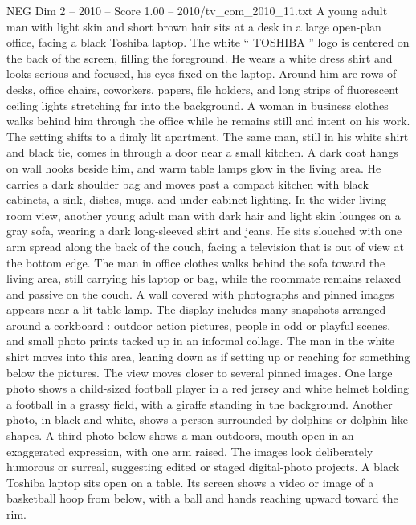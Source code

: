 \begin{textsample}{NEG Dim 2 – 2010 – Score 1.00 – 2010/tv\_com\_2010\_11.txt}  \label{ex:f2_neg_047}
A young adult man with light skin and short brown hair sits at a desk in a large open-plan office, facing a black Toshiba laptop.
The white “ TOSHIBA ” logo is centered on the back of the screen, filling the foreground.
He wears a white dress shirt and looks serious and focused, his eyes fixed on the laptop.
Around him are rows of desks, office chairs, coworkers, papers, file holders, and long strips of fluorescent ceiling lights stretching far into the background.
A woman in business clothes walks behind him through the office while he remains still and intent on his work.
The setting shifts to a dimly lit apartment.
The same man, still in his white shirt and black tie, comes in through a door near a small kitchen.
A dark coat hangs on wall hooks beside him, and warm table lamps glow in the living area.
He carries a dark shoulder bag and moves past a compact kitchen with black cabinets, a sink, dishes, mugs, and under-cabinet lighting.
In the wider living room view, another young adult man with dark hair and light skin lounges on a gray sofa, wearing a dark long-sleeved shirt and jeans.
He sits slouched with one arm spread along the back of the couch, facing a television that is out of view at the bottom edge.
The man in office clothes walks behind the sofa toward the living area, still carrying his laptop or bag, while the roommate remains relaxed and passive on the couch.
A wall covered with photographs and pinned images appears near a lit table lamp.
The display includes many snapshots arranged around a corkboard : outdoor action pictures, people in odd or playful scenes, and small photo prints tacked up in an informal collage.
The man in the white shirt moves into this area, leaning down as if setting up or reaching for something below the pictures.
The view moves closer to several pinned images.
One large photo shows a child-sized football player in a red jersey and white helmet holding a football in a grassy field, with a giraffe standing in the background.
Another photo, in black and white, shows a person surrounded by dolphins or dolphin-like shapes.
A third photo below shows a man outdoors, mouth open in an exaggerated expression, with one arm raised.
The images look deliberately humorous or surreal, suggesting edited or staged digital-photo projects.
A black Toshiba laptop sits open on a table.
Its screen shows a video or image of a basketball hoop from below, with a ball and hands reaching upward toward the rim.

\end{textsample}

